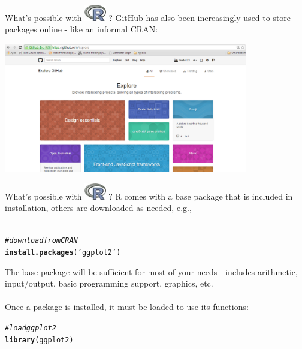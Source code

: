 \documentclass[xcolor=svgnames]{beamer}\usepackage[]{graphicx}\usepackage[]{color}
\makeatletter
\newcommand{\hlstr}[1]{\textcolor[rgb]{0.192,0.494,0.8}{#1}}%
\newcommand{\hlcom}[1]{\textcolor[rgb]{0.678,0.584,0.686}{\textit{#1}}}%
\newcommand{\hlstd}[1]{\textcolor[rgb]{0.345,0.345,0.345}{#1}}%
\newcommand{\hlkwd}[1]{\textcolor[rgb]{0.737,0.353,0.396}{\textbf{#1}}}%
\newenvironment{kframe}{%
 \def\at@end@of@kframe{}%
 \ifinner\ifhmode%
  \def\at@end@of@kframe{\end{minipage}}%
  \begin{minipage}{\columnwidth}%
 \fi\fi%
 \def\FrameCommand##1{\hskip\@totalleftmargin \hskip-\fboxsep
 \colorbox{shadecolor}{##1}\hskip-\fboxsep
     \hskip-\linewidth \hskip-\@totalleftmargin \hskip\columnwidth}%
 \MakeFramed {\advance\hsize-\width
   \@totalleftmargin\z@ \linewidth\hsize
   \@setminipage}}%
 {\par\unskip\endMakeFramed%
 \at@end@of@kframe}
\newenvironment{knitrout}{}{} %
\makeatother
\begin{document}
\begin{frame}[t]{What's possible with \includegraphics[width=0.07\textwidth]{Rlogo.jpg} \hspace{0.2em}? }
\href{https://github.com/}{GitHub} has also been increasingly used to store packages online  - like an informal CRAN:
\begin{center}
\includegraphics[width = 0.8\textwidth]{git.png}
\end{center}
\end{frame}

\begin{frame}[t,fragile]{What's possible with \includegraphics[width=0.07\textwidth]{Rlogo.jpg} \hspace{0.2em}? }
R comes with a base package that is included in installation, others are downloaded as needed, e.g.,\\~\\
\begin{knitrout}\scriptsize
{}\color{fgcolor}\begin{kframe}
\begin{alltt}
\hlcom{# download from CRAN}
\hlkwd{install.packages}\hlstd{(}\hlstr{'ggplot2'}\hlstd{)}
\end{alltt}
\end{kframe}
\end{knitrout}
\vspace{0.2in}
The base package will be sufficient for most of your needs - includes arithmetic, input/output, basic programming support, graphics, etc.\\~\\
Once a package is installed, it must be loaded to use its functions:
\begin{knitrout}\scriptsize
{}\color{fgcolor}\begin{kframe}
\begin{alltt}
\hlcom{# load ggplot2}
\hlkwd{library}\hlstd{(ggplot2)}
\end{alltt}
\end{kframe}
\end{knitrout}
\end{frame}
\end{document}
